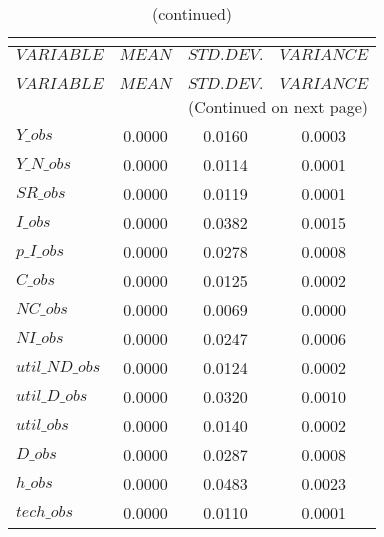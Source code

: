  
\begin{center}
\begin{longtable}{lccc} 
\caption{THEORETICAL MOMENTS}\\
 \label{Table:th_moments}\\
\toprule 
$VARIABLE       $	 & 	 $         MEAN$	 & 	 $    STD. DEV.$	 & 	 $     VARIANCE$\\
\midrule \endfirsthead 
\caption{(continued)}\\
 \toprule \\ 
$VARIABLE       $	 & 	 $         MEAN$	 & 	 $    STD. DEV.$	 & 	 $     VARIANCE$\\
\midrule \endhead 
\midrule \multicolumn{4}{r}{(Continued on next page)} \\ \bottomrule \endfoot 
\bottomrule \endlastfoot 
$Y\_obs         $	 & 	       0.0000	 & 	       0.0160	 & 	       0.0003 \\ 
$Y\_N\_obs      $	 & 	       0.0000	 & 	       0.0114	 & 	       0.0001 \\ 
$SR\_obs        $	 & 	       0.0000	 & 	       0.0119	 & 	       0.0001 \\ 
$I\_obs         $	 & 	       0.0000	 & 	       0.0382	 & 	       0.0015 \\ 
$p\_I\_obs      $	 & 	       0.0000	 & 	       0.0278	 & 	       0.0008 \\ 
$C\_obs         $	 & 	       0.0000	 & 	       0.0125	 & 	       0.0002 \\ 
$NC\_obs        $	 & 	       0.0000	 & 	       0.0069	 & 	       0.0000 \\ 
$NI\_obs        $	 & 	       0.0000	 & 	       0.0247	 & 	       0.0006 \\ 
$util\_ND\_obs  $	 & 	       0.0000	 & 	       0.0124	 & 	       0.0002 \\ 
$util\_D\_obs   $	 & 	       0.0000	 & 	       0.0320	 & 	       0.0010 \\ 
$util\_obs      $	 & 	       0.0000	 & 	       0.0140	 & 	       0.0002 \\ 
$D\_obs         $	 & 	       0.0000	 & 	       0.0287	 & 	       0.0008 \\ 
$h\_obs         $	 & 	       0.0000	 & 	       0.0483	 & 	       0.0023 \\ 
$tech\_obs      $	 & 	       0.0000	 & 	       0.0110	 & 	       0.0001 \\ 
\end{longtable}
 \end{center}
